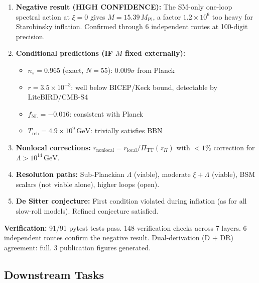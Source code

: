 \documentclass[11pt,a4paper]{article}
\theoremstyle{plain}
\theoremstyle{definition}
\begin{document}
\begin{tcolorbox}[colback=yellow!5!white, colframe=orange!50!black,
  title={\textbf{INF-1 Main Results --- CONDITIONAL}}]
\begin{enumerate}[nosep]
  \item \textbf{Negative result (HIGH CONFIDENCE):}
    The SM-only one-loop spectral action at $\xi = 0$ gives
    $M = 15.39\,M_{\mathrm{Pl}}$, a factor $1.2 \times 10^6$ too heavy
    for Starobinsky inflation.  Confirmed through 6 independent routes
    at 100-digit precision.

  \item \textbf{Conditional predictions (IF $M$ fixed externally):}
    \begin{itemize}[nosep]
      \item $n_s = 0.965$ (exact, $N = 55$): 0.009$\sigma$ from Planck
      \item $r = 3.5 \times 10^{-3}$: well below BICEP/Keck bound,
        detectable by LiteBIRD/CMB-S4
      \item $f_{\mathrm{NL}} = -0.016$: consistent with Planck
      \item $T_{\mathrm{reh}} = 4.9 \times 10^9\,\mathrm{GeV}$:
        trivially satisfies BBN
    \end{itemize}

  \item \textbf{Nonlocal corrections:}
    $r_{\mathrm{nonlocal}} = r_{\mathrm{local}} / \Pi_{\mathrm{TT}}(z_H)$
    with $< 1$\% correction for $\Lambda > 10^{14}\,\mathrm{GeV}$.

  \item \textbf{Resolution paths:}
    Sub-Planckian $\Lambda$ (viable), moderate $\xi + \Lambda$ (viable),
    BSM scalars (not viable alone), higher loops (open).

  \item \textbf{De Sitter conjecture:}
    First condition violated during inflation (as for all slow-roll models).
    Refined conjecture satisfied.
\end{enumerate}

\medskip
\noindent\textbf{Verification:} 91/91 pytest tests pass.
148 verification checks across 7 layers.
6 independent routes confirm the negative result.
Dual-derivation (D + DR) agreement: full.
3 publication figures generated.
\end{tcolorbox}

\subsection{Downstream Tasks}
\end{document}
